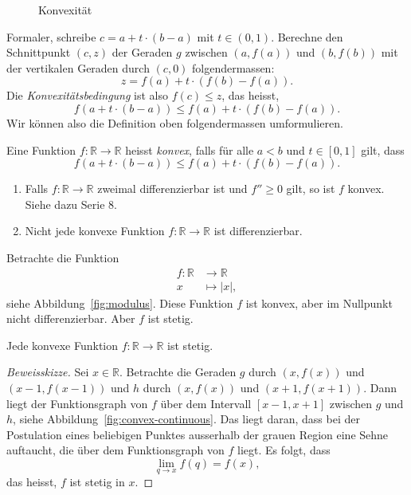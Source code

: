 \documentclass[../main.tex]{subfiles}
\begin{document}
\begin{figure}[htb]
  \centering
  
  \caption{Konvexität}%
  \label{fig:convexity}
\end{figure}

Formaler, schreibe
$
  c = a + t \cdot (b-a)
  $
mit $t \in (0, 1)$.
Berechne den Schnittpunkt $(c, z)$ der
Geraden $g$ zwischen
$(a, f(a))$ und $(b, f(b))$ 
mit der vertikalen Geraden durch $(c, 0)$ 
folgendermassen:
\[
  z = f(a) + t \cdot (f(b) - f(a)).
\]
Die \emph{Konvexitätsbedingung} ist also
$f(c) \leq z$, das heisst,
\[
  f(a + t \cdot (b-a)) \leq f(a) + t\cdot (f(b) - f(a)).
\]
Wir können also die Definition oben folgendermassen
umformulieren.

\begin{definition}
  Eine Funktion $f \colon \mathbb{R} \to \mathbb{R}$ 
  heisst \emph{konvex}, falls für alle $a < b$ 
  und $t \in [0, 1]$ gilt, dass
  \[
    f(a + t \cdot (b - a)) \leq f(a) + t\cdot (f(b) - f(a)).
  \]
\end{definition}

\newpage
\begin{remarks}
  \leavevmode
  \begin{enumerate}[(1)]
    \item Falls $f \colon \mathbb{R} \to \mathbb{R}$ 
      zweimal differenzierbar ist und $f'' \geq 0$ gilt,
      so ist $f$ konvex. Siehe dazu Serie 8.
    \item Nicht jede konvexe Funktion
      $f \colon \mathbb{R} \to \mathbb{R}$ ist
      differenzierbar.
  \end{enumerate}
\end{remarks}

\begin{example}
  Betrachte die Funktion
  \begin{align*}
    f \colon \mathbb{R} & \to \mathbb{R} \\
    x & \mapsto |x|,
  \end{align*}
  siehe Abbildung~\ref{fig:modulus}.
  Diese Funktion $f$ ist konvex, aber im
  Nullpunkt nicht differenzierbar.
  Aber $f$ ist stetig.
\end{example}

\begin{claim}
  Jede konvexe Funktion $f \colon \mathbb{R} \to \mathbb{R}$ 
  ist stetig.
\end{claim}

\begin{proof}[Beweisskizze]
  Sei $x \in \mathbb{R}$.
  Betrachte die Geraden $g$ 
  durch $(x, f(x))$ und $(x-1, f(x-1))$
  und $h$ durch $(x, f(x))$ und $(x+  1, f(x+1))$.
  Dann liegt der Funktionsgraph von $f$ 
  über dem Intervall $[x-1, x+1]$ zwischen
  $g$ und $h$, siehe Abbildung~\ref{fig:convex-continuous}.
  Das liegt daran, dass bei der Postulation
  eines beliebigen Punktes ausserhalb
  der grauen Region eine Sehne auftaucht,
  die über dem Funktionsgraph von $f$ liegt.
  Es folgt, dass
  \[
    \lim_{q \to x} f(q) = f(x),
  \]
  das heisst, $f$ ist stetig in $x$.
\end{proof}
\end{document}
